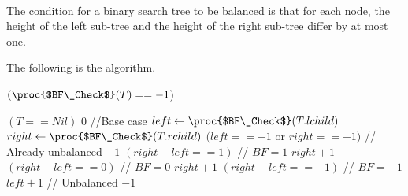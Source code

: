 \documentclass[11pt, answers]{exam}
\theoremstyle{plain}
\theoremstyle{definition}
\begin{document}
\begin{questions}
\begin{solution}
\begin{parts}
\begin{minipage}[t]{\linewidth}
\end{minipage}

\end{parts}

\end{solution}

\question
\begin{solution}

\end{solution}


\question
\begin{solution}\\
The condition for a binary search tree to be balanced is that for each node, the height of the left sub-tree and the height of the right sub-tree differ by at most one.

The following is the algorithm.

\begin{codebox}
\li \If $(\proc{$BF\_Check$}(T) == -1$)
\li     \Then \Return {}
\li \Else
\li     \Return {}
\end{codebox}

\begin{codebox}
\li \If $(T == Nil)$ 
\li     \Then \Return $0$ //Base case
\li \Else
\li     $left \gets \proc{$BF\_Check$}(T.lchild)$
\li     $right \gets \proc{$BF\_Check$}(T.rchild)$
\li     \If $(left == -1 $ or $ right == -1)$ // Already unbalanced
\li         \Then \Return $-1$ 
\li     \ElseIf $(right - left == 1)$       // $BF=1$
\li         \Then \Return $right+1$ 
\li     \ElseIf $(right - left == 0)$       // $BF=0$
\li         \Then \Return $right+1$ 
\li     \ElseIf $(right - left == -1)$      // $BF=-1$
\li         \Then \Return $left+1$ 
\li     \Else // Unbalanced
\li         \Return $-1$ \End \End
\end{codebox}


\end{solution}
\end{questions}
\end{document}
